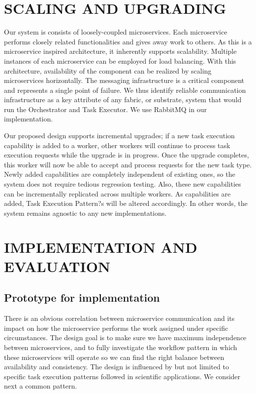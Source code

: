 \documentclass[review]{elsarticle}
\begin{document}
\section{SCALING AND UPGRADING}

Our system is consists of loosely-coupled microservices. Each microservice performs closely related functionalities and gives away work to others. As this is a microservice inspired architecture, it inherently supports scalability. Multiple instances of each microservice can be employed for load balancing. With this architecture, availability of the component can be realized by scaling microservices horizontally. The messaging infrastructure is a critical component and represents a single point of failure. We thus identify reliable communication infrastructure as a key attribute of any fabric, or substrate, system that would run the Orchestrator and Task Executor. We use RabbitMQ in our implementation. 

Our proposed design supports incremental upgrades; if a new task execution capability is added to a worker, other workers will continue to process task execution requests while the upgrade is in progress. Once the upgrade completes, this worker will now be able to accept and process requests for the new task type. Newly added capabilities are completely independent of existing ones, so the system does not require tedious regression testing. Also, these new capabilities can be incrementally replicated across multiple workers. As capabilities are added, Task Execution Pattern?s will be altered accordingly.  In other words, the system remains agnostic to any new implementations.

\section{IMPLEMENTATION AND EVALUATION}

\subsection{Prototype for implementation}
There is an obvious correlation between microservice communication and its impact on how the microservice performs the work assigned under specific circumstances. The design goal is to make sure we have maximum independence between microservices, and to fully investigate the workflow pattern in which these microservices will operate so we can find the right balance between availability and consistency.
The design is influenced by but not limited to specific task execution patterns followed in scientific applications.   We consider next a common pattern. 
\end{document}
